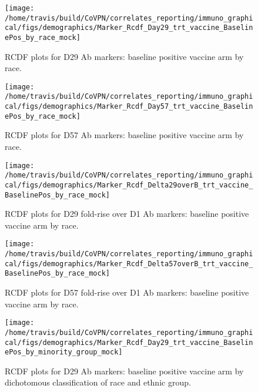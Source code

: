 \documentclass[]{book}
\theoremstyle{definition}
\theoremstyle{definition}
\theoremstyle{definition}
\newcommand{\1}{\mathbbm{1}}
\begin{document}
\clearpage
\begin{figure}[H]

{\centering \texttt{[image: /home/travis/build/CoVPN/correlates\_reporting/immuno\_graphical/figs/demographics/Marker\_Rcdf\_Day29\_trt\_vaccine\_BaselinePos\_by\_race\_mock]} 

}

\caption{RCDF plots for D29 Ab markers: baseline positive vaccine arm by race.}\label{fig:unnamed-chunk-116}
\end{figure}

\clearpage
\begin{figure}[H]

{\centering \texttt{[image: /home/travis/build/CoVPN/correlates\_reporting/immuno\_graphical/figs/demographics/Marker\_Rcdf\_Day57\_trt\_vaccine\_BaselinePos\_by\_race\_mock]} 

}

\caption{RCDF plots for D57 Ab markers: baseline positive vaccine arm by race.}\label{fig:unnamed-chunk-117}
\end{figure}

\clearpage
\begin{figure}[H]

{\centering \texttt{[image: /home/travis/build/CoVPN/correlates\_reporting/immuno\_graphical/figs/demographics/Marker\_Rcdf\_Delta29overB\_trt\_vaccine\_BaselinePos\_by\_race\_mock]} 

}

\caption{RCDF plots for D29 fold-rise over D1 Ab markers: baseline positive vaccine arm by race.}\label{fig:unnamed-chunk-118}
\end{figure}

\clearpage
\begin{figure}[H]

{\centering \texttt{[image: /home/travis/build/CoVPN/correlates\_reporting/immuno\_graphical/figs/demographics/Marker\_Rcdf\_Delta57overB\_trt\_vaccine\_BaselinePos\_by\_race\_mock]} 

}

\caption{RCDF plots for D57 fold-rise over D1 Ab markers: baseline positive vaccine arm by race.}\label{fig:unnamed-chunk-119}
\end{figure}

\clearpage
\begin{figure}[H]

{\centering \texttt{[image: /home/travis/build/CoVPN/correlates\_reporting/immuno\_graphical/figs/demographics/Marker\_Rcdf\_Day29\_trt\_vaccine\_BaselinePos\_by\_minority\_group\_mock]} 

}

\caption{RCDF plots for D29 Ab markers: baseline positive vaccine arm by dichotomous classification of race and ethnic group.}\label{fig:unnamed-chunk-120}
\end{figure}
\end{document}
